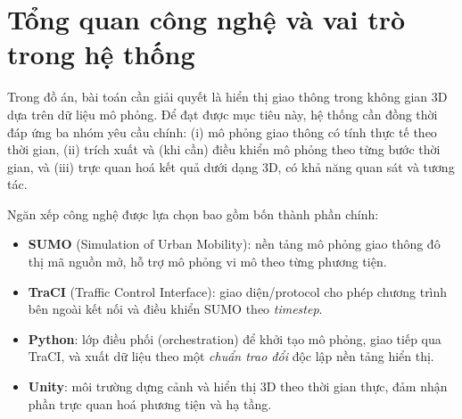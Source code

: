\documentclass[../DoAn.tex]{subfiles}
\begin{document}






\section{Tổng quan công nghệ và vai trò trong hệ thống}
Trong đồ án, bài toán cần giải quyết là hiển thị giao thông trong không gian 3D dựa trên dữ liệu mô phỏng. Để đạt được mục tiêu này, hệ thống cần đồng thời đáp ứng ba nhóm yêu cầu chính: (i) mô phỏng giao thông có tính thực tế theo thời gian, (ii) trích xuất và (khi cần) điều khiển mô phỏng theo từng bước thời gian, và (iii) trực quan hoá kết quả dưới dạng 3D, có khả năng quan sát và tương tác.

Ngăn xếp công nghệ được lựa chọn bao gồm bốn thành phần chính:
\begin{itemize}[leftmargin=2em]
	\item \textbf{\gls{SUMO}} (Simulation of Urban Mobility): nền tảng mô phỏng giao thông đô thị mã nguồn mở, hỗ trợ mô phỏng vi mô theo từng phương tiện.
	\item \textbf{\gls{TraCI}} (Traffic Control Interface): giao diện/protocol cho phép chương trình bên ngoài kết nối và điều khiển SUMO theo \textit{timestep}.
	\item \textbf{Python}: lớp điều phối (orchestration) để khởi tạo mô phỏng, giao tiếp qua TraCI, và xuất dữ liệu theo một \textit{chuẩn trao đổi} độc lập nền tảng hiển thị.
	\item \textbf{Unity}: môi trường dựng cảnh và hiển thị 3D theo thời gian thực, đảm nhận phần trực quan hoá phương tiện và hạ tầng.
\end{itemize}
\end{document}
